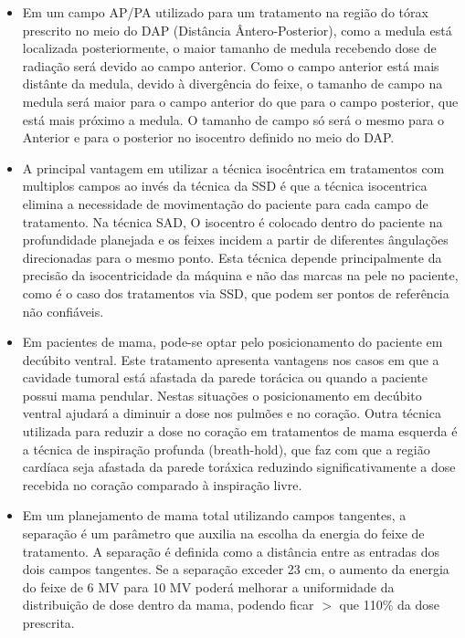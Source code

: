 \documentclass[11pt,a4paper]{article}
\newcounter{exemplo}
\begin{document}
\begin{exemplo}
\begin{itemize}
        \item Em um campo AP/PA utilizado para um tratamento na região do tórax prescrito no meio do DAP (Distância Ântero-Posterior), como a medula está localizada posteriormente, o maior tamanho de medula recebendo dose de radiação será devido ao campo anterior. Como o campo anterior está mais distânte da medula, devido à divergência do feixe, o tamanho de campo na medula será maior para o campo anterior do que para o campo posterior, que está mais próximo a medula. O tamanho de campo só será o mesmo para o Anterior e para o posterior no isocentro definido no meio do DAP. 
        
        \item A principal vantagem em utilizar a técnica isocêntrica em tratamentos com multiplos campos ao invés da técnica da SSD é que a técnica isocentrica elimina a necessidade de movimentação do paciente para cada campo de tratamento. Na técnica SAD, O isocentro é colocado dentro do paciente na profundidade planejada e os feixes incidem a partir de diferentes ângulações direcionadas para o mesmo ponto. Esta técnica depende principalmente da precisão da isocentricidade da máquina e não das marcas na pele no paciente, como é o caso dos tratamentos via SSD, que podem ser pontos de referência não confiáveis.

        \item Em pacientes de mama, pode-se optar pelo posicionamento do paciente em decúbito ventral. Este tratamento apresenta vantagens nos casos em que a cavidade tumoral está afastada da parede torácica ou quando a paciente possui mama pendular. Nestas situações o posicionamento em decúbito ventral ajudará a diminuir a dose nos pulmões e no coração. Outra técnica utilizada para reduzir a dose no coração em tratamentos de mama esquerda é a técnica de inspiração profunda (breath-hold), que faz com que a região cardíaca seja afastada da parede toráxica reduzindo significativamente a dose recebida no coração comparado à inspiração livre. 
        
        \item Em um planejamento de mama total utilizando campos tangentes, a separação é um parâmetro que auxilia na escolha da energia do feixe de tratamento. A separação é definida como a distância entre as entradas dos dois campos tangentes. Se a separação exceder 23 cm, o aumento da energia do feixe de 6 MV para 10 MV poderá melhorar a uniformidade da distribuição de dose dentro da mama, podendo ficar $>$ que 110\% da dose prescrita. 


\end{itemize}
\end{exemplo}
\end{document}
